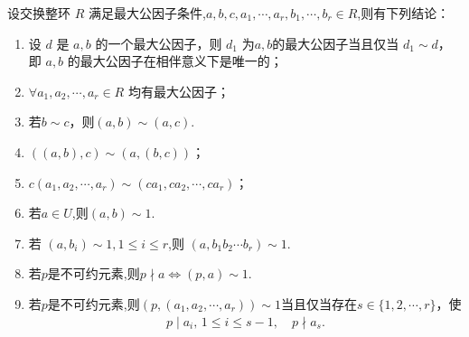 \documentclass[../../main.tex]{subfiles}%
\begin{document}
\begin{lemma}\label{lemma:最大公因子条件的基本结论}
设交换整环 \( R \) 满足最大公因子条件,$a,b,c,a_1,\cdots,a_r,b_1,\cdots,b_r\in R$,则有下列结论：
\begin{enumerate}[(1)]
\item\label{lemma:最大公因子条件的基本结论-1} 设 \( d \) 是 \( a, b \) 的一个最大公因子，则 \( d_1 \) 为$a,b$的最大公因子当且仅当 \( d_1 \sim d \)，即 \( a, b \) 的最大公因子在相伴意义下是唯一的；

\item\label{lemma:最大公因子条件的基本结论-2} \( \forall a_1, a_2, \cdots, a_r \in R \) 均有最大公因子；

\item\label{lemma:最大公因子条件的基本结论-6} 若$b \sim c$，则$(a, b) \sim (a, c)$.

\item\label{lemma:最大公因子条件的基本结论-3} \( ((a, b), c) \sim (a, (b, c)) \)；

\item\label{lemma:最大公因子条件的基本结论-4} \( c\left( a_1,a_2,\cdots ,a_r \right) \sim \left( ca_1,ca_2,\cdots ,ca_r \right)\)；

\item\label{lemma:最大公因子条件的基本结论-7} 若$a\in U$,则$(a,b)\sim 1.$ 

\item\label{lemma:最大公因子条件的基本结论-5} 若 \( \left( a,b_i \right) \sim 1,1\leqslant i\leqslant r \),则 \( \left( a,b_1b_2\cdots b_r \right) \sim 1\).

\item\label{lemma:最大公因子条件的基本结论-8} 若$p$是不可约元素,则$p\nmid a\iff (p,a)\sim 1.$

\item\label{lemma:最大公因子条件的基本结论-9} 若$p$是不可约元素,则$(p,(a_1,a_2,\cdots,a_r)) \sim 1$当且仅当存在$s \in \{1,2,\cdots,r\}$，使
\begin{align*}
p \mid a_i,\,1 \leqslant i \leqslant s-1, \quad p \nmid a_s.
\end{align*}
\end{enumerate}
\end{lemma}
\end{document}
